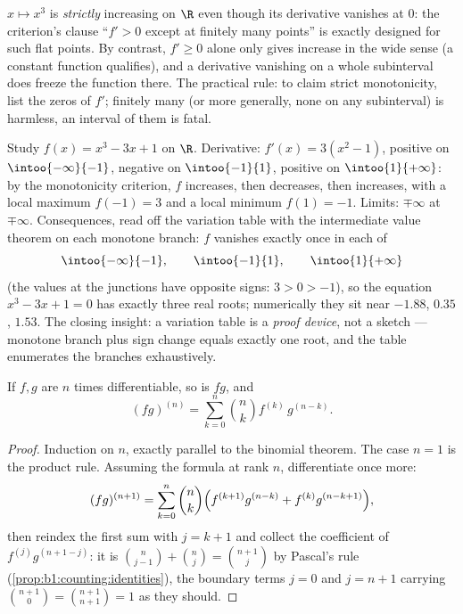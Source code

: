 \begin{example}\label{ex:b1:derivative:strictness}
$x \mapsto x^3$ is \emph{strictly} increasing on $\R$ even
though its derivative vanishes at $0$: the criterion's clause
``$f' > 0$ except at finitely many points'' is exactly designed
for such flat points. By contrast, $f' \geq 0$ alone only gives
increase in the wide sense (a constant function qualifies), and
a derivative vanishing on a whole subinterval does freeze the
function there. The practical rule: to claim strict
monotonicity, list the zeros of $f'$; finitely many (or more
generally, none on any subinterval) is harmless, an interval of
them is fatal.
\end{example}

\begin{example}\label{ex:b1:derivative:variations}
Study $f(x) = x^3 - 3x + 1$ on $\R$. Derivative: $f'(x) =
3(x^2 - 1)$, positive on $\intoo{-\infty}{-1}$, negative on
$\intoo{-1}{1}$, positive on $\intoo{1}{+\infty}$: by the
monotonicity criterion, $f$ increases, then decreases, then
increases, with a local maximum $f(-1) = 3$ and a local minimum
$f(1) = -1$. Limits: $\mp\infty$ at $\mp\infty$. Consequences,
read off the variation table with the intermediate value
theorem on each monotone branch: $f$ vanishes exactly once in
each of
\[
\intoo{-\infty}{-1}, \qquad \intoo{-1}{1}, \qquad
\intoo{1}{+\infty}
\]
(the values at the junctions have opposite signs: $3 > 0 > -1$),
so the equation $x^3 - 3x + 1 = 0$ has exactly three real
roots; numerically they sit near $-1.88$, $0.35$, $1.53$. The
closing insight: a variation table is a \emph{proof device},
not a sketch --- monotone branch plus sign change equals
exactly one root, and the table enumerates the branches
exhaustively.
\end{example}

\begin{theorem}\label{thm:b1:derivative:leibniz}
If $f, g$ are $n$ times differentiable, so is $fg$,
and
\[
(fg)^{(n)} = \sum_{k=0}^{n} \binom nk f^{(k)}\, g^{(n-k)} .
\]
\end{theorem}

\begin{proof}
Induction on $n$, exactly parallel to the binomial theorem. The
case $n = 1$ is the product rule. Assuming the formula at rank
$n$, differentiate once more:
\[
(fg)^{(n+1)} = \sum_{k=0}^{n} \binom nk
\Bigl( f^{(k+1)} g^{(n-k)} + f^{(k)} g^{(n-k+1)} \Bigr),
\]
then reindex the first sum with $j = k + 1$ and collect the
coefficient of $f^{(j)} g^{(n+1-j)}$: it is $\binom{n}{j-1} +
\binom nj = \binom{n+1}{j}$ by Pascal's rule
(\cref{prop:b1:counting:identities}), the boundary terms $j = 0$
and $j = n + 1$ carrying $\binom{n+1}{0} = \binom{n+1}{n+1} =
1$ as they should.
\end{proof}

